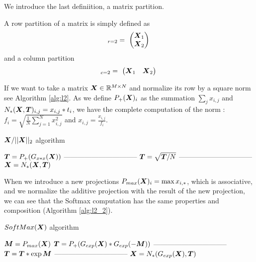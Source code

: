 \documentclass[acmsmall]{acmart}
\begin{document}
We introduce the last definiition, a matrix partition.
\begin{definition}
  A row partition of a matrix is simply defined as
  \begin{equation}
    [\Vc{X} ]_{r=2} = \
    \begin{pmatrix}
      \Vc{X}_1  \\
      \Vc{X}_2  \\
    \end{pmatrix}\\
  \end{equation}
  and a column partition
  \begin{equation}
    [\Vc{X} ]_{c=2} = \
    \begin{pmatrix}
      \Vc{X}_1  & \Vc{X}_2  \\
    \end{pmatrix}\\
  \end{equation}
\end{definition}
If we want to take a matrix ${\boldsymbol X} \in \mathbb{R}^{M\times N}$ and normalize
its row by a square norm see Algorithm \ref{alg:l2}. As we define
$P_+({\boldsymbol X})_i$ as the summation $\sum_j x_{i,j}$ and $N_*({\boldsymbol X},
{\boldsymbol T})_{i,j} = x_{i,j}*t_i$, we have the complete computation of the
norm : $f_i = \sqrt{\frac{1}{N}\sum_{j=1}^N x_{i,j}^2}$ and $x_{i,j}
= \frac{x_{i,j}}{f_i}$.

\begin{algorithm}
    \caption{${\boldsymbol X}/||{\boldsymbol X}||_2$ algorithm}
    \label{alg:l2}
    \begin{algorithmic}
      \STATE ${\boldsymbol T} = P_+(G_{x*x}({\boldsymbol X}))$
      \STATE --------------------------------
      \STATE ${\boldsymbol T} = \sqrt{{\boldsymbol T}/N}$     
      \STATE --------------------------------
      \STATE ${\boldsymbol X} = N_*({\boldsymbol X},{\boldsymbol T})$  
    \end{algorithmic}
\end{algorithm}

When we introduce a new projections $P_{max}({\boldsymbol X})_i =
\max{x_{i,*}}$, which is associative, and we normalize the additive
projection with the result of the new projection, we can see that the
Softmax computation has the same properties and composition (Algorithm \ref{alg:l2_2}).

\begin{algorithm}
    \caption{$SoftMax({\boldsymbol X})$ algorithm}
    \label{alg:l2_2}
    \begin{algorithmic}
      \STATE ${\boldsymbol M} = P_{max}({\boldsymbol X})$
      \STATE ${\boldsymbol T} = P_+(G_{exp}({\boldsymbol X})*G_{exp}(-{\boldsymbol M}))$
      \STATE --------------------------------
      \STATE ${\boldsymbol T} = {\boldsymbol T}*\exp{{\boldsymbol M}}$    
      \STATE --------------------------------
      \STATE ${\boldsymbol X} = N_*(G_{exp}({\boldsymbol X}),{\boldsymbol T})$ 
    \end{algorithmic}
\end{algorithm}
\end{document}
